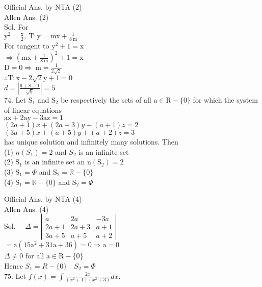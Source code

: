 \documentclass[10pt]{article}
\begin{document}
Official Ans. by NTA (2)\\
Allen Ans. (2)\\
Sol. For\\
\(\mathrm{y}^{2}=\frac{\mathrm{x}}{2}, \mathrm{~T}: \mathrm{y}=\mathrm{mx}+\frac{1}{8 \mathrm{~m}}\)\\
For tangent to \(\mathrm{y}^{2}+1=\mathrm{x}\)\\
\(\Rightarrow\left(\mathrm{mx}+\frac{1}{8 \mathrm{~m}}\right)^{2}+1=\mathrm{x}\)\\
\(\mathrm{D}=0 \Rightarrow \mathrm{~m}=\frac{1}{2 \sqrt{2}}\)\\
\(\therefore \mathrm{T}: \mathrm{x}-2 \sqrt{2} \mathrm{y}+1=0\)\\
\(d=\left|\frac{6+8+1}{\sqrt{9}}\right|=5\)\\
74. Let \(\mathrm{S}_{1}\) and \(\mathrm{S}_{2}\) be respectively the sets of all \(\mathrm{a} \in \mathrm{R}-\{0\}\) for which the system of linear equations\\
\(\mathrm{ax}+2 \mathrm{ay}-3 \mathrm{az}=1\)\\
\((2 a+1) x+(2 a+3) y+(a+1) z=2\)\\
\((3 a+5) x+(a+5) y+(a+2) z=3\)\\
has unique solution and infinitely many solutions. Then\\
(1) \(n\left(S_{1}\right)=2\) and \(S_{2}\) is an infinite set\\
(2) \(\mathrm{S}_{1}\) is an infinite set an \(\mathrm{n}\left(\mathrm{S}_{2}\right)=2\)\\
(3) \(\mathrm{S}_{1}=\Phi\) and \(\mathrm{S}_{2}=\mathbb{R}-\{0\}\)\\
(4) \(\mathrm{S}_{1}=\mathbb{R}-\{0\}\) and \(\mathrm{S}_{2}=\Phi\)

Official Ans. by NTA (4)\\
Allen Ans. (4)\\
Sol. \(\quad \Delta=\left|\begin{array}{lll}a & 2 a & -3 a \\ 2 a+1 & 2 a+3 & a+1 \\ 3 a+5 & a+5 & a+2\end{array}\right|\)\\
\(=\mathrm{a}\left(15 \mathrm{a}^{2}+31 \mathrm{a}+36\right)=0 \Rightarrow \mathrm{a}=0\)\\
\(\Delta \neq 0\) for all \(\mathrm{a} \in \mathrm{R}-\{0\}\)\\
Hence \(S_{1}=R-\{0\} \quad S_{2}=\Phi\)\\
75. Let \(f(x)=\int \frac{2 x}{\left(x^{2}+1\right)\left(x^{2}+3\right)} d x\).
\end{document}
